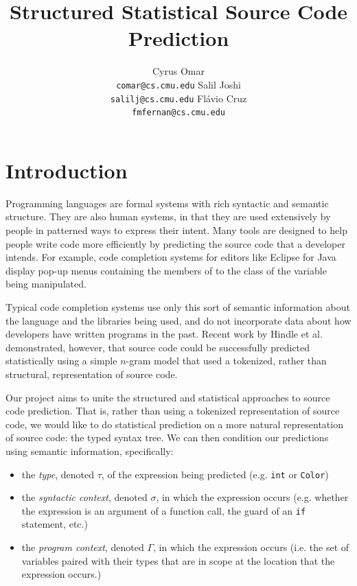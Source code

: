 \documentclass{article} %
\title{Structured Statistical Source Code Prediction}
\author{
  Cyrus Omar\\
  \texttt{comar@cs.cmu.edu}
  \And
  Salil Joshi\\
  \texttt{salilj@cs.cmu.edu}
  \And Fl\'avio Cruz\\
  \texttt{fmfernan@cs.cmu.edu}
}
\begin{document}
\maketitle

\section*{Introduction}
Programming languages are formal systems with rich syntactic and semantic structure. They are
also human systems, in that they are used extensively by people in patterned ways to express their
intent. Many tools are designed to help people write code more efficiently by predicting
the source code that a developer intends. For example, code completion systems for editors like Eclipse for Java display pop-up menus containing the members of to the class of the variable being manipulated. 

Typical code completion systems use only this sort of semantic
information about the language and the libraries being used, and do not incorporate data about how developers have written programs
in the past. Recent work by Hindle et al.~\cite{Hindle:2012:NS:2337223.2337322} demonstrated, however, that source code could be successfully predicted statistically
using a simple $n$-gram model that used a tokenized, rather than structural, representation of source code. 

Our project aims to unite the structured and statistical approaches to source code prediction.
That is, rather than using a tokenized representation of source code, we would like to do
statistical prediction on a more natural representation of source code: the typed syntax tree.  We can then condition our predictions using semantic information, specifically:
\begin{itemize}
\item the \emph{type}, denoted $\tau$, of the expression being predicted (e.g. \verb|int| or \verb|Color|)
\item the \emph{syntactic context}, denoted $\sigma$, in which the expression occurs (e.g. whether the expression is an argument of a function call, the guard of an \verb|if| statement, etc.)
\item the \emph{program context}, denoted $\Gamma$, in which the expression occurs (i.e. the set of variables paired with their types that are in scope at the location that the expression occurs.)
\end{itemize}
\end{document}
